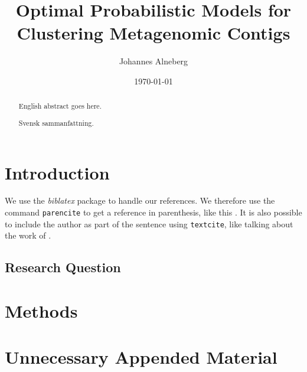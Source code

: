 \documentclass{kththesis}
\title{Optimal Probabilistic Models for Clustering Metagenomic Contigs}
\author{Johannes Alneberg}
\date{\today}
\begin{document}
\frontmatter

\titlepage

\begin{abstract}
  English abstract goes here.

  \blindtext
\end{abstract}


\begin{otherlanguage}{swedish}
  \begin{abstract}
    Svensk sammanfattning.
  \end{abstract}
\end{otherlanguage}


\tableofcontents


\mainmatter


\chapter{Introduction}

We use the \emph{biblatex} package to handle our references.  We therefore use the
command \texttt{parencite} to get a reference in parenthesis, like this
\parencite{heisenberg2015}.  It is also possible to include the author
as part of the sentence using \texttt{textcite}, like talking about
the work of \textcite{einstein2016}.



\section{Research Question}

\blindtext

\chapter{Methods}

\blindtext

\printbibliography[heading=bibintoc] %

\appendix

\chapter{Unnecessary Appended Material}
\end{document}
